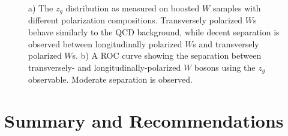 \documentclass[11pt,letterpaper]{article}
\begin{document}
\begin{figure}
\begin{center}
\end{center}
\caption{a) The $z_g$ distribution as measured on boosted $W$ samples with different polarization compositions. Transversely polarized $W$s behave similarly to the QCD background, while decent separation is observed between longitudinally polarized $W$s and transversely polarized $W$s. b) A ROC curve showing the separation between transversely- and longitudinally-polarized $W$ bosons using the $z_g$ observable. Moderate separation is observed.}
\end{figure}











\section{Summary and Recommendations}\label{sec:conc}
\end{document}
